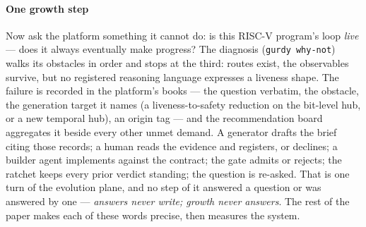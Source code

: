 \paragraph{One growth step}
Now ask the platform something it cannot do: is this RISC-V program's
loop \emph{live} --- does it always eventually make progress? The
diagnosis (\texttt{gurdy why-not}) walks its obstacles in order
and stops at the third: routes exist, the observables survive, but no
registered reasoning language expresses a liveness shape. The failure
is recorded in the platform's books --- the question verbatim, the
obstacle, the generation target it names (a liveness-to-safety
reduction on the bit-level hub, or a new temporal hub), an origin tag
--- and the recommendation board aggregates it beside every other
unmet demand. A generator drafts the brief citing those records; a
human reads the evidence and registers, or declines; a builder agent
implements against the contract; the gate admits or rejects; the
ratchet keeps every prior verdict standing; the question is re-asked.
That is one turn of the evolution plane, and no step of it answered a
question or was answered by one --- \emph{answers never write; growth
never answers}. The rest of
the paper makes each of these words precise, then measures the system.

